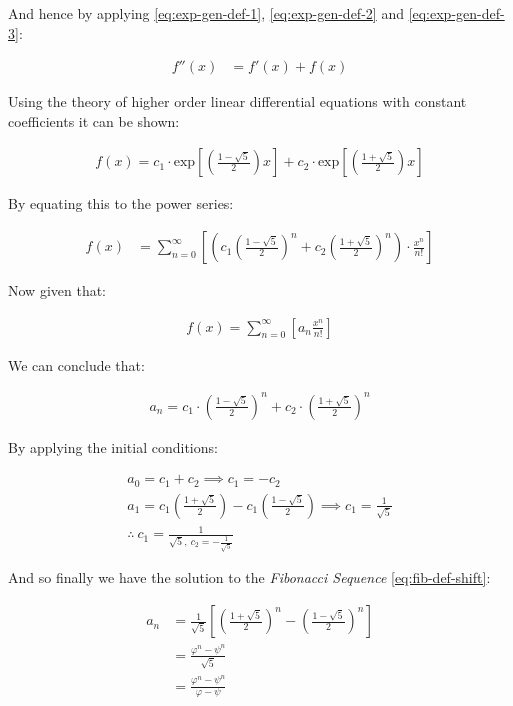 \documentclass[a4paper,11pt,twoside]{article}
\begin{document}
And hence by applying \eqref{eq:exp-gen-def-1}, \eqref{eq:exp-gen-def-2} and \eqref{eq:exp-gen-def-3}:

\begin{align}
f''\left( x \right) &= f'\left( x \right)+  f\left( x \right)
\end{align}


Using the theory of higher order linear differential equations with
constant coefficients it can be shown:


\begin{align*}
f\left( x \right)= c_1 \cdot  \mathrm{exp}\left[ \left( \frac{1- \sqrt{5} }{2} \right)x \right] +  c_2 \cdot  \mathrm{exp}\left[ \left( \frac{1 +  \sqrt{5} }{2} \right)x \right]
\end{align*}


By equating this to the power series:


\begin{align*}
f\left( x \right)&= \sum^{\infty}_{n= 0}   \left[ \left( c_1\left( \frac{1- \sqrt{5} }{2} \right)^n +  c_2  \left( \frac{1+ \sqrt{5} }{2} \right)^n \right) \cdot  \frac{x^n}{n!} \right]
\end{align*}


Now given that:


\begin{align*}
f\left( x \right)= \sum^{\infty}_{n= 0}   \left[ a_n \frac{x^n}{n!} \right]
\end{align*}


We can conclude that:


\begin{align*}
a_n = c_1\cdot  \left( \frac{1- \sqrt{5} }{2} \right)^n +  c_2 \cdot  \left( \frac{1+  \sqrt{5} }{2} \right)^n
\end{align*}


By applying the initial conditions:


\begin{align*}
a_0= c_1 +  c_2  \implies  c_1= - c_2\\
a_1= c_1 \left( \frac{1+ \sqrt{5} }{2} \right) -  c_1 \left( \frac{1-\sqrt{5} }{2} \right)  \implies  c_1 = \frac{1}{\sqrt{5} }\\
\therefore ~ c_1 = \frac{1}{\sqrt{5}, ~ c_2 = -\frac{1}{\sqrt{5}}}
\end{align*}


And so finally we have the solution to the \emph{Fibonacci Sequence} \ref{eq:fib-def-shift}:


\begin{align}
    a_n &= \frac{1}{\sqrt{5} } \left[ \left( \frac{1+  \sqrt{5} }{2}  \right)^n -  \left( \frac{1- \sqrt{5} }{2} \right)^n \right] \nonumber \\
&= \frac{\varphi^n - \psi^n}{\sqrt{5} } \nonumber\\
&=\frac{\varphi^n -  \psi^n}{\varphi - \psi} \label{eq:fib-sol}
\end{align}
\end{document}
